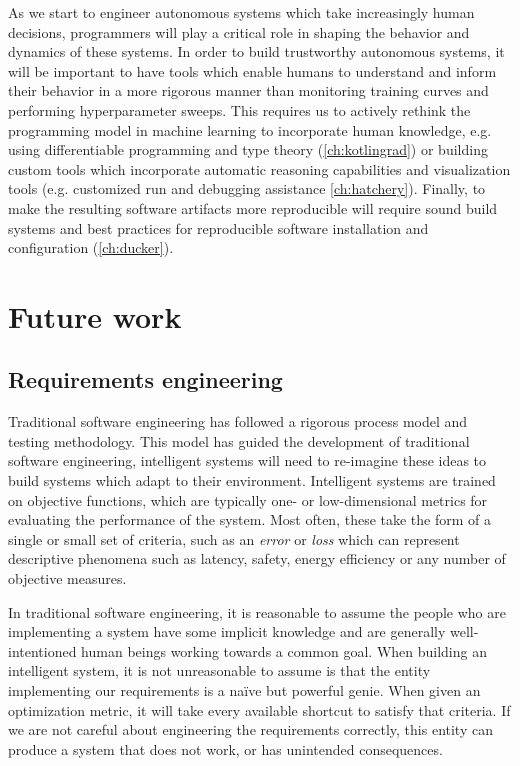 As we start to engineer autonomous systems which take increasingly human decisions, programmers will play a critical role in shaping the behavior and dynamics of these systems. In order to build trustworthy autonomous systems, it will be important to have tools which enable humans to understand and inform their behavior in a more rigorous manner than monitoring training curves and performing hyperparameter sweeps. This requires us to actively rethink the programming model in machine learning to incorporate human knowledge, e.g. using differentiable programming and type theory (\autoref{ch:kotlingrad}) or building custom tools which incorporate automatic reasoning capabilities and visualization tools (e.g. customized run and debugging assistance \autoref{ch:hatchery}). Finally, to make the resulting software artifacts more reproducible will require sound build systems and best practices for reproducible software installation and configuration (\autoref{ch:ducker}).

\section{Future work}

\subsection{Requirements engineering}

Traditional software engineering has followed a rigorous process model and testing methodology. This model has guided the development of traditional software engineering, intelligent systems will need to re-imagine these ideas to build systems which adapt to their environment. Intelligent systems are trained on objective functions, which are typically one- or low-dimensional metrics for evaluating the performance of the system. Most often, these take the form of a single or small set of criteria, such as an \textit{error} or \textit{loss} which can represent descriptive phenomena such as latency, safety, energy efficiency or any number of objective measures.

In traditional software engineering, it is reasonable to assume the people who are implementing a system have some implicit knowledge and are generally well-intentioned human beings working towards a common goal. When building an intelligent system, it is not unreasonable to assume is that the entity implementing our requirements is a na\"ive but powerful genie. When given an optimization metric, it will take every available shortcut to satisfy that criteria. If we are not careful about engineering the requirements correctly, this entity can produce a system that does not work, or has unintended consequences.

